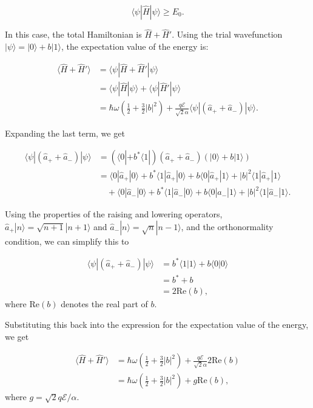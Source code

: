 \documentclass{article}
\begin{document}
\[
\langle \psi | \hat{H} | \psi \rangle \geq E_0.
\]

In this case, the total Hamiltonian is \(\hat{H} + \hat{H}'\). Using the trial wavefunction \(|\psi\rangle = |0\rangle + b |1\rangle\), the expectation value of the energy is:

\begin{align*}
\langle \hat{H} + \hat{H}' \rangle &= \langle \psi | \hat{H} + \hat{H}' | \psi \rangle \\
&= \langle \psi | \hat{H} | \psi \rangle + \langle \psi | \hat{H}' | \psi \rangle \\
&= \hbar \omega \left( \frac{1}{2} + \frac{3}{2} |b|^2 \right) + \frac{q \mathcal{E}}{\sqrt{2} \alpha} \langle \psi | (\hat{a}_+ + \hat{a}_-) | \psi \rangle.
\end{align*}

Expanding the last term, we get

\begin{align*}
\langle \psi | (\hat{a}_+ + \hat{a}_-) | \psi \rangle &= (\langle 0 | + b^* \langle 1 |)(\hat{a}_+ + \hat{a}_-)(|0\rangle + b |1\rangle) \\
&= \langle 0 | \hat{a}_+ | 0 \rangle + b^* \langle 1 | \hat{a}_+ | 0 \rangle + b \langle 0 | \hat{a}_+ | 1 \rangle + |b|^2 \langle 1 | \hat{a}_+ | 1 \rangle \\
&\quad + \langle 0 | \hat{a}_- | 0 \rangle + b^* \langle 1 | \hat{a}_- | 0 \rangle + b \langle 0 | \hat{a}_- | 1 \rangle + |b|^2 \langle 1 | \hat{a}_- | 1 \rangle.
\end{align*}

Using the properties of the raising and lowering operators, \(\hat{a}_+ |n\rangle = \sqrt{n+1} |n+1\rangle\) and \(\hat{a}_- |n\rangle = \sqrt{n} |n-1\rangle\), and the orthonormality condition, we can simplify this to

\begin{align*}
\langle \psi | (\hat{a}_+ + \hat{a}_-) | \psi \rangle &= b^* \langle 1 | 1 \rangle + b \langle 0 | 0 \rangle \\
&= b^* + b \\
&= 2 \text{Re}(b),
\end{align*}
where \(\text{Re}(b)\) denotes the real part of \(b\).

Substituting this back into the expression for the expectation value of the energy, we get

\begin{align*}
\langle \hat{H} + \hat{H}' \rangle &= \hbar \omega \left( \frac{1}{2} + \frac{3}{2} |b|^2 \right) + \frac{q \mathcal{E}}{\sqrt{2} \alpha} 2 \text{Re}(b) \\
&= \hbar \omega \left( \frac{1}{2} + \frac{3}{2} |b|^2 \right) + g \text{Re}(b),
\end{align*}
where \(g = \sqrt{2} q \mathcal{E} / \alpha\).
\end{document}
